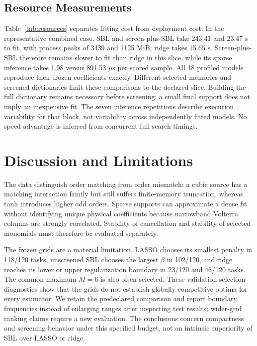 \documentclass[conference]{IEEEtran}
\begin{document}
\subsection{Resource Measurements}

Table~\ref{tab:resources} separates fitting cost from deployment cost. In the representative combined case, SBL and screen-plus-SBL take 243.41 and 23.47 s to fit, with process peaks of 3439 and 1125 MiB; ridge takes 15.65 s. Screen-plus-SBL therefore remains slower to fit than ridge in this slice, while its sparse inference takes 1.98 versus 891.53 $\mu$s per scored sample. All 18 profiled models reproduce their frozen coefficients exactly. Different selected memories and screened dictionaries limit these comparisons to the declared slice. Building the full dictionary remains necessary before screening; a small final support does not imply an inexpensive fit. The seven inference repetitions describe execution variability for that block, not variability across independently fitted models. No speed advantage is inferred from concurrent full-search timings.

\section{Discussion and Limitations}\label{sec:discussion}
The data distinguish order matching from order mismatch: a cubic source has a matching interaction family but still suffers finite-memory truncation, whereas tanh introduces higher odd orders. Sparse supports can approximate a dense fit without identifying unique physical coefficients because narrowband Volterra columns are strongly correlated. Stability of cancellation and stability of selected monomials must therefore be evaluated separately.

The frozen grids are a material limitation. LASSO chooses its smallest penalty in 118/120 tasks, unscreened SBL chooses the largest $\beta$ in 102/120, and ridge reaches its lower or upper regularization boundary in 23/120 and 46/120 tasks. The common maximum $M=6$ is also often selected. These validation-selection diagnostics show that the grids do not establish globally competitive optima for every estimator. We retain the predeclared comparison and report boundary frequencies instead of enlarging ranges after inspecting test results; wider-grid ranking claims require a new evaluation. The conclusions concern compactness and screening behavior under this specified budget, not an intrinsic superiority of SBL over LASSO or ridge.
\end{document}
